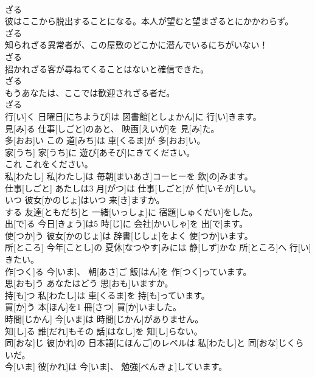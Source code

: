 \documentclass[8pt]{extreport}
\begin{document}
\begin{CJK}{UTF8}{min}
\\	ざる
\\	彼はここから脱出することになる。本人が望むと望まざるとにかかわらず。	
\\	ざる
\\	知られざる異常者が、この屋敷のどこかに潜んでいるにちがいない！	
\\	ざる
\\	招かれざる客が尋ねてくることはないと確信できた。	
\\	ざる
\\	もうあなたは、ここでは歓迎されざる者だ。	
\\	ざる
\\	行[い]く	日曜日[にちようび]は 図書館[としょかん]に 行[い]きます。		
\\	見[み]る	仕事[しごと]のあと、 映画[えいが]を 見[み]た。		
\\	多[おお]い	この 道[みち]は 車[くるま]が 多[おお]い。		
\\	家[うち]	家[うち]に 遊び[あそび]にきてください。		
\\	これ	これをください。		
\\	私[わたし]	私[わたし]は 毎朝[まいあさ]コーヒーを 飲[の]みます。		
\\	仕事[しごと]	あたしは3 月[がつ]は 仕事[しごと]が 忙[いそが]しい。		
\\	いつ	彼女[かのじょ]はいつ 来[き]ますか。		
\\	する	友達[ともだち]と 一緒[いっしょ]に 宿題[しゅくだい]をした。		
\\	出[で]る	今日[きょう]は5 時[じ]に 会社[かいしゃ]を 出[で]ます。		
\\	使[つか]う	彼女[かのじょ]は 辞書[じしょ]をよく 使[つか]います。		
\\	所[ところ]	今年[ことし]の 夏休[なつやす]みには 静[しず]かな 所[ところ]へ 行[い]きたい。		
\\	作[つく]る	今[いま]、 朝[あさ]ご 飯[はん]を 作[つく]っています。		
\\	思[おも]う	あなたはどう 思[おも]いますか。		
\\	持[も]つ	私[わたし]は 車[くるま]を 持[も]っています。		
\\	買[か]う	本[ほん]を1 冊[さつ] 買[か]いました。		
\\	時間[じかん]	今[いま]は 時間[じかん]がありません。		
\\	知[し]る	誰[だれ]もその 話[はなし]を 知[し]らない。		
\\	同[おな]じ	彼[かれ]の 日本語[にほんご]のレベルは 私[わたし]と 同[おな]じくらいだ。		
\\	今[いま]	彼[かれ]は 今[いま]、 勉強[べんきょ]しています。		

\end{CJK}
\end{document}
